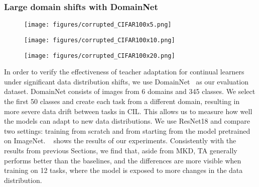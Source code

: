 \documentclass[10pt,twocolumn,letterpaper]{article}
\newcommand\rev[1]{{#1}}
\newcommand\ta{TA}
\begin{document}

\subsubsection{Large domain shifts with DomainNet}
\label{sec:exp:domainnet}

\begin{figure*}[!ht]
    \centering
    \begin{subfigure}[b]{0.33\textwidth}
        \centering
        \texttt{[image: figures/corrupted\_CIFAR100x5.png]}
          \end{subfigure}
    \begin{subfigure}[b]{0.33\textwidth}
        \centering
        \texttt{[image: figures/corrupted\_CIFAR100x10.png]}
    \end{subfigure}
    \begin{subfigure}[b]{0.33\textwidth}
        \centering
        \texttt{[image: figures/corrupted\_CIFAR100x20.png]}
    \end{subfigure}

   \caption{
   Average incremental accuracy for standard KD and our method of \ta\ under varying strength of data shift on splits of CIFAR100. As the noise strengthens, the gap between \ta\ and standard KD widens, indicating that our method leads to more robust learning in case of data shifts. We obtain data shifts by adding noise of varying strength to every other task, using the Gaussian noise and noise severity scale proposed by Michaelis et al.~\cite{michaelis2019dragon}. 
   }
   \label{fig:corruptions}
\end{figure*}
In order to verify the effectiveness of teacher adaptation for continual learners under significant data distribution shifts, we use DomainNet~\cite{peng2019moment} as our evaluation dataset. DomainNet consists of images from 6 domains and 345 classes. We select the first 50 classes and create each task from a different domain, resulting in more severe data drift between tasks in CIL. This allows us to measure how well the models can adapt to new data distributions. We use ResNet18 and compare two settings: training from scratch and from starting from the model pretrained on ImageNet. ~ shows the results of our experiments. \rev{Consistently with the results from previous Sections, we find that, aside from MKD, TA generally performs better than the baselines, and the differences are more visible when training on 12 tasks, where the model is exposed to more changes in the data distribution.}
\end{document}
